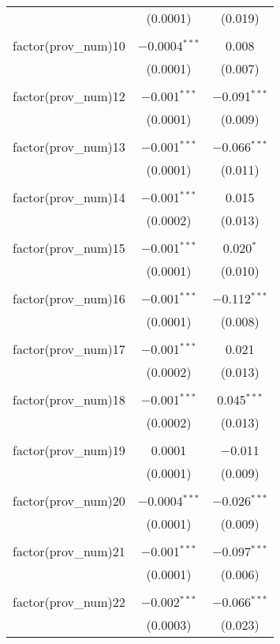 \begin{table}[ht!]
\begin{tabular}{@{\extracolsep{5pt}}lcc}
  & (0.0001) & (0.019) \\ 
  & & \\ 
 factor(prov\_num)10 & $-$0.0004$^{***}$ & 0.008 \\ 
  & (0.0001) & (0.007) \\ 
  & & \\ 
 factor(prov\_num)12 & $-$0.001$^{***}$ & $-$0.091$^{***}$ \\ 
  & (0.0001) & (0.009) \\ 
  & & \\ 
 factor(prov\_num)13 & $-$0.001$^{***}$ & $-$0.066$^{***}$ \\ 
  & (0.0001) & (0.011) \\ 
  & & \\ 
 factor(prov\_num)14 & $-$0.001$^{***}$ & 0.015 \\ 
  & (0.0002) & (0.013) \\ 
  & & \\ 
 factor(prov\_num)15 & $-$0.001$^{***}$ & 0.020$^{*}$ \\ 
  & (0.0001) & (0.010) \\ 
  & & \\ 
 factor(prov\_num)16 & $-$0.001$^{***}$ & $-$0.112$^{***}$ \\ 
  & (0.0001) & (0.008) \\ 
  & & \\ 
 factor(prov\_num)17 & $-$0.001$^{***}$ & 0.021 \\ 
  & (0.0002) & (0.013) \\ 
  & & \\ 
 factor(prov\_num)18 & $-$0.001$^{***}$ & 0.045$^{***}$ \\ 
  & (0.0002) & (0.013) \\ 
  & & \\ 
 factor(prov\_num)19 & 0.0001 & $-$0.011 \\ 
  & (0.0001) & (0.009) \\ 
  & & \\ 
 factor(prov\_num)20 & $-$0.0004$^{***}$ & $-$0.026$^{***}$ \\ 
  & (0.0001) & (0.009) \\ 
  & & \\ 
 factor(prov\_num)21 & $-$0.001$^{***}$ & $-$0.097$^{***}$ \\ 
  & (0.0001) & (0.006) \\ 
  & & \\ 
 factor(prov\_num)22 & $-$0.002$^{***}$ & $-$0.066$^{***}$ \\ 
  & (0.0003) & (0.023) \\ 

\end{tabular}
\end{table}
